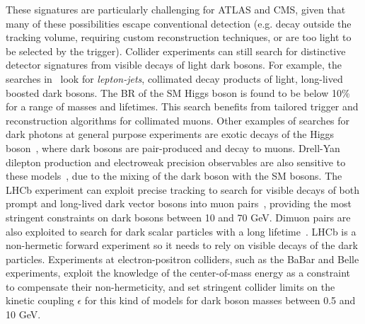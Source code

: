 These signatures are particularly challenging for ATLAS and CMS, given that many of these possibilities escape
conventional detection (e.g. decay outside the tracking volume, requiring custom reconstruction techniques, or 
are too light to be selected by the trigger). 
Collider experiments can still search for distinctive detector signatures from visible decays of light dark bosons. 
For example, the searches in~\cite{ATLAS:2016jza} look for \textit{lepton-jets}, collimated decay products of light,
long-lived boosted dark bosons.
The BR of the SM Higgs boson is found to be below 10\% for a range of masses and lifetimes. This search benefits from tailored
trigger and reconstruction algorithms for collimated muons. Other examples of searches for dark photons at
general purpose experiments are exotic decays of the Higgs boson~\cite{Aad:2015sva.CMS-PAS-HIG-16-035}, 
where dark bosons are pair-produced and decay to muons. 
Drell-Yan dilepton production
and electroweak precision observables are also sensitive to these models~\cite{Curtin:2014cca},
due to the mixing of the dark boson with the SM bosons. 
The LHCb experiment can exploit precise tracking 
to search for visible decays of both prompt and long-lived dark vector bosons into muon pairs~\cite{Aaij:2017rft},
providing the most stringent constraints on dark bosons between 10 and 70 GeV. Dimuon pairs are 
also exploited to search for dark scalar particles with a long lifetime~\cite{Aaij:2016qsm}. %
LHCb is a non-hermetic forward experiment so it needs to rely on visible decays of the dark particles. 
Experiments at electron-positron colliders, such as the BaBar and Belle experiments,
exploit the knowledge of the center-of-mass energy as a constraint to compensate their non-hermeticity, 
and set stringent collider limits on the kinetic coupling $\epsilon$ for this kind of models
for dark boson masses between 0.5 and 10 GeV. 


